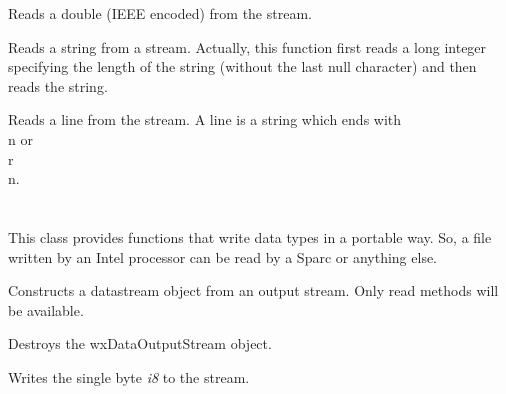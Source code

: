 Reads a double (IEEE encoded) from the stream.



Reads a string from a stream. Actually, this function first reads a long integer
specifying the length of the string (without the last null character) and then
reads the string.



Reads a line from the stream. A line is a string which ends with \\n or \\r\\n.

\section{}\label{wxdataoutputstream}

This class provides functions that write data types in a
portable way. So, a file written by an Intel processor can be read by a
Sparc or anything else.


\label{wxdataoutputstreamconstr}


Constructs a datastream object from an output stream. Only read methods will
be available.





Destroys the wxDataOutputStream object.



Writes the single byte {\it i8} to the stream.


